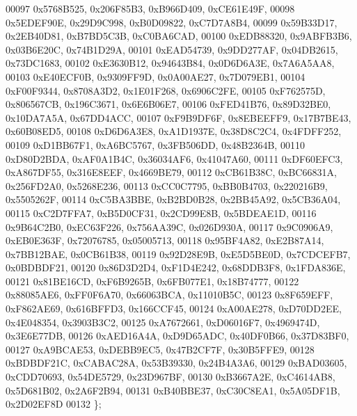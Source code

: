 \begin{DoxyCode}
00097    0x5768B525, 0x206F85B3, 0xB966D409, 0xCE61E49F,
00098    0x5EDEF90E, 0x29D9C998, 0xB0D09822, 0xC7D7A8B4,
00099    0x59B33D17, 0x2EB40D81, 0xB7BD5C3B, 0xC0BA6CAD,
00100    0xEDB88320, 0x9ABFB3B6, 0x03B6E20C, 0x74B1D29A,
00101    0xEAD54739, 0x9DD277AF, 0x04DB2615, 0x73DC1683,
00102    0xE3630B12, 0x94643B84, 0x0D6D6A3E, 0x7A6A5AA8,
00103    0xE40ECF0B, 0x9309FF9D, 0x0A00AE27, 0x7D079EB1,
00104    0xF00F9344, 0x8708A3D2, 0x1E01F268, 0x6906C2FE,
00105    0xF762575D, 0x806567CB, 0x196C3671, 0x6E6B06E7,
00106    0xFED41B76, 0x89D32BE0, 0x10DA7A5A, 0x67DD4ACC,
00107    0xF9B9DF6F, 0x8EBEEFF9, 0x17B7BE43, 0x60B08ED5,
00108    0xD6D6A3E8, 0xA1D1937E, 0x38D8C2C4, 0x4FDFF252,
00109    0xD1BB67F1, 0xA6BC5767, 0x3FB506DD, 0x48B2364B,
00110    0xD80D2BDA, 0xAF0A1B4C, 0x36034AF6, 0x41047A60,
00111    0xDF60EFC3, 0xA867DF55, 0x316E8EEF, 0x4669BE79,
00112    0xCB61B38C, 0xBC66831A, 0x256FD2A0, 0x5268E236,
00113    0xCC0C7795, 0xBB0B4703, 0x220216B9, 0x5505262F,
00114    0xC5BA3BBE, 0xB2BD0B28, 0x2BB45A92, 0x5CB36A04,
00115    0xC2D7FFA7, 0xB5D0CF31, 0x2CD99E8B, 0x5BDEAE1D,
00116    0x9B64C2B0, 0xEC63F226, 0x756AA39C, 0x026D930A,
00117    0x9C0906A9, 0xEB0E363F, 0x72076785, 0x05005713,
00118    0x95BF4A82, 0xE2B87A14, 0x7BB12BAE, 0x0CB61B38,
00119    0x92D28E9B, 0xE5D5BE0D, 0x7CDCEFB7, 0x0BDBDF21,
00120    0x86D3D2D4, 0xF1D4E242, 0x68DDB3F8, 0x1FDA836E,
00121    0x81BE16CD, 0xF6B9265B, 0x6FB077E1, 0x18B74777,
00122    0x88085AE6, 0xFF0F6A70, 0x66063BCA, 0x11010B5C,
00123    0x8F659EFF, 0xF862AE69, 0x616BFFD3, 0x166CCF45,
00124    0xA00AE278, 0xD70DD2EE, 0x4E048354, 0x3903B3C2,
00125    0xA7672661, 0xD06016F7, 0x4969474D, 0x3E6E77DB,
00126    0xAED16A4A, 0xD9D65ADC, 0x40DF0B66, 0x37D83BF0,
00127    0xA9BCAE53, 0xDEBB9EC5, 0x47B2CF7F, 0x30B5FFE9,
00128    0xBDBDF21C, 0xCABAC28A, 0x53B39330, 0x24B4A3A6,
00129    0xBAD03605, 0xCDD70693, 0x54DE5729, 0x23D967BF,
00130    0xB3667A2E, 0xC4614AB8, 0x5D681B02, 0x2A6F2B94,
00131    0xB40BBE37, 0xC30C8EA1, 0x5A05DF1B, 0x2D02EF8D
00132 \};
\end{DoxyCode}
